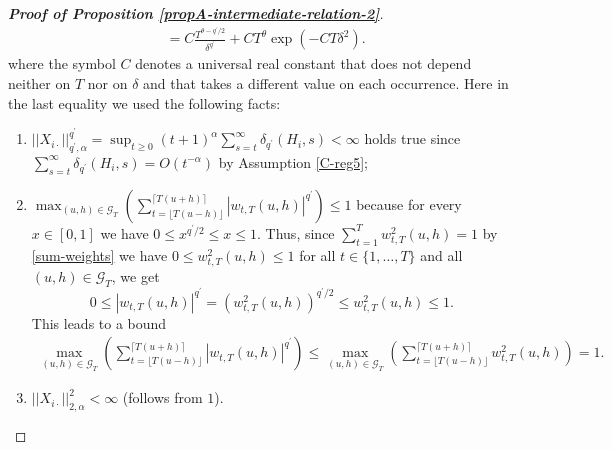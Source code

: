 \documentclass[a4paper,12pt]{article}
\begin{document}
\begin{proof}[\textnormal{\textbf{Proof of Proposition \ref{propA-intermediate-relation-2}}}]
\begin{align*}
&= C \frac{ T^{\theta - q^\prime/2}}{\delta^{q^\prime}} + C T^\theta \exp \left(-C T \delta^2\right).
\end{align*}
where the symbol $C$ denotes a universal real constant that does not depend neither on $T$ nor on $\delta$ and that takes a different value on each occurrence. Here in the last equality we used the following facts:
\begin{enumerate}
	\item $||X_{i\cdot}||^{q^\prime}_{q^\prime, \alpha} = \sup_{t\geq 0} (t+1)^{\alpha} \sum_{s=t}^{\infty} \delta_{q^\prime}(H_{i}, s)  < \infty$ holds true since $\sum_{s=t}^{\infty}\delta_{q^\prime}(H_{i}, s) = O(t^{-\alpha})$ by Assumption \ref{C-reg5};
	\item $\max_{(u, h) \in \mathcal{G}_T} \left( \sum_{t=\lfloor T(u-h) \rfloor}^{\lceil T(u+h) \rceil} |w_{t,T}(u,h)|^{q^\prime}\right) \leq 1$ because for every $x \in [0, 1]$ we have $ 0 \leq x^{q^\prime/2} \leq x \leq 1$. Thus, since $\sum_{t=1}^{T} w^2_{t,T}(u,h) = 1$ by \eqref{sum-weights} we have \linebreak $0 \leq w^2_{t,T}(u,h) \leq 1$ for all $t\in \{1, \ldots, T\}$ and all $(u, h) \in \mathcal{G}_T$, we get
$$ 0 \leq |w_{t,T}(u,h)|^{q^\prime} =  (w^2_{t,T}(u,h))^{q^\prime/2} \leq w^2_{t,T}(u,h) \leq 1.$$
This leads to a bound  
\begin{align*}
\max_{(u, h) \in \mathcal{G}_T} \left( \sum_{t=\lfloor T(u-h) \rfloor}^{\lceil T(u+h) \rceil} |w_{t,T}(u,h)|^{q^\prime}\right) \leq
\max_{(u, h) \in \mathcal{G}_T} \left( \sum_{t=\lfloor T(u-h) \rfloor}^{\lceil T(u+h) \rceil} w_{t,T}^2(u,h)\right) =1.
\end{align*}
	\item $||X_{i\cdot}||^{2}_{2, \alpha} < \infty$ (follows from $1$).
\end{enumerate}



\end{proof}
\end{document}
